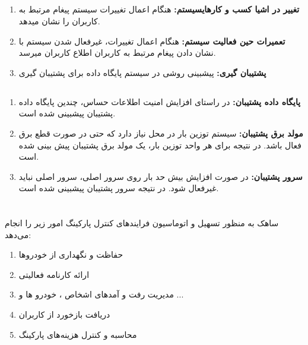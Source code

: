 \documentclass[oneside,a4paper,12pt]{book}
\begin{document}
	\subsection{}
	\begin{enumerate}[label = --]
		\item\textbf{تغییر در اشیا کسب و کارهایسیستم:}
		هنگام اعمال تغییرات سیستم پیغام مرتبط به کاربران را نشان میدهد.
		
		\item\textbf{تعمیرات حین فعالیت سیستم:}
		هنگام اعمال تغییرات، غیرفعال شدن سیستم با نشان دادن پیغام مرتبط به کاربران اطلاع کاربران میرسد.
		
		\item\textbf{پشتیبان گیری:}
		پیشبینی روشی در سیستم پایگاه داده برای پشتیبان گیری
		
	\end{enumerate}
	
	\subsection{}
	\begin{enumerate}[label = --]
		\item\textbf{پایگاه داده پشتیبان:}
		در راستای افزایش امنیت اطلاعات حساس، چندین پایگاه داده پشتیبان پیشبینی شده است.
		\item\textbf{مولد برق پشتیبان:}
		سیستم توزین بار در محل نیاز دارد که حتی در صورت قطع برق فعال باشد. در نتیجه برای
		هر واحد توزین بار، یک مولد برق پشتیبان پیش بینی شده است.
		\item\textbf{سرور پشتیبان:}
		در صورت افزایش بیش حد بار روی سرور اصلی، سرور اصلی نباید غیرفعال شود. در نتیجه
		سرور پشتیبان پیشبینی شده است.
	\end{enumerate}
	
	\section{}
	ساهک به منظور تسهیل و اتوماسیون فرایندهای کنترل پارکینگ امور زیر را انجام می‌دهد:
	\begin{enumerate}
		\item
		حفاظت و نگهداری از خودروها
		\item
		ارائه کارنامه فعالیتی
		\item
		مدیریت رفت و آمدهای اشخاص ، خودرو ها و ...
		\item
		دریافت بازخورد از کاربران
		\item
		محاسبه و کنترل هزینه‌های پارکینگ
	\end{enumerate}
	
\end{document}
